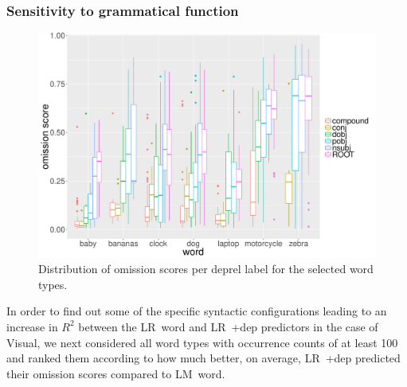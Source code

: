 \subsubsection{Sensitivity to grammatical function}
\label{sec:gramfunc}


\begin{figure}[t]
  \centering
  \includegraphics[scale=0.35]{top_words.pdf}
  \caption{Distribution of omission scores per deprel label for the selected word types.}
  \label{fig:top_words}
\end{figure}

In order to find out some of the specific syntactic configurations leading to
an increase in $R^2$ between the {\sc LR~word} and {\sc LR~+dep} predictors
in the case of {\sc Visual}, we next considered all word types with
occurrence counts of at least 100 and ranked them according to how much
better, on average, {\sc LR~+dep} predicted their omission scores 
compared to {\sc LM~word}. 

